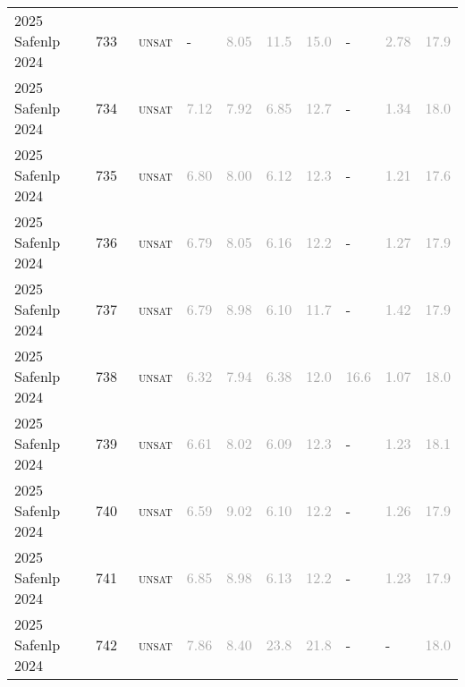 \begin{center}
{\begin{longtable}{@{}llllllllll@{}}
2025 Safenlp 2024 & 733 & ~\textsc{unsat} & - & \textcolor{darkgray}{8.05} & \textcolor{darkgray}{11.5} & \textcolor{darkgray}{15.0} & - & \textcolor{darkgray}{2.78} & \textcolor{darkgray}{17.9} \\
2025 Safenlp 2024 & 734 & ~\textsc{unsat} & \textcolor{darkgray}{7.12} & \textcolor{darkgray}{7.92} & \textcolor{darkgray}{6.85} & \textcolor{darkgray}{12.7} & - & \textcolor{darkgray}{1.34} & \textcolor{darkgray}{18.0} \\
2025 Safenlp 2024 & 735 & ~\textsc{unsat} & \textcolor{darkgray}{6.80} & \textcolor{darkgray}{8.00} & \textcolor{darkgray}{6.12} & \textcolor{darkgray}{12.3} & - & \textcolor{darkgray}{1.21} & \textcolor{darkgray}{17.6} \\
2025 Safenlp 2024 & 736 & ~\textsc{unsat} & \textcolor{darkgray}{6.79} & \textcolor{darkgray}{8.05} & \textcolor{darkgray}{6.16} & \textcolor{darkgray}{12.2} & - & \textcolor{darkgray}{1.27} & \textcolor{darkgray}{17.9} \\
2025 Safenlp 2024 & 737 & ~\textsc{unsat} & \textcolor{darkgray}{6.79} & \textcolor{darkgray}{8.98} & \textcolor{darkgray}{6.10} & \textcolor{darkgray}{11.7} & - & \textcolor{darkgray}{1.42} & \textcolor{darkgray}{17.9} \\
2025 Safenlp 2024 & 738 & ~\textsc{unsat} & \textcolor{darkgray}{6.32} & \textcolor{darkgray}{7.94} & \textcolor{darkgray}{6.38} & \textcolor{darkgray}{12.0} & \textcolor{darkgray}{16.6} & \textcolor{darkgray}{1.07} & \textcolor{darkgray}{18.0} \\
2025 Safenlp 2024 & 739 & ~\textsc{unsat} & \textcolor{darkgray}{6.61} & \textcolor{darkgray}{8.02} & \textcolor{darkgray}{6.09} & \textcolor{darkgray}{12.3} & - & \textcolor{darkgray}{1.23} & \textcolor{darkgray}{18.1} \\
2025 Safenlp 2024 & 740 & ~\textsc{unsat} & \textcolor{darkgray}{6.59} & \textcolor{darkgray}{9.02} & \textcolor{darkgray}{6.10} & \textcolor{darkgray}{12.2} & - & \textcolor{darkgray}{1.26} & \textcolor{darkgray}{17.9} \\
2025 Safenlp 2024 & 741 & ~\textsc{unsat} & \textcolor{darkgray}{6.85} & \textcolor{darkgray}{8.98} & \textcolor{darkgray}{6.13} & \textcolor{darkgray}{12.2} & - & \textcolor{darkgray}{1.23} & \textcolor{darkgray}{17.9} \\
2025 Safenlp 2024 & 742 & ~\textsc{unsat} & \textcolor{darkgray}{7.86} & \textcolor{darkgray}{8.40} & \textcolor{darkgray}{23.8} & \textcolor{darkgray}{21.8} & - & - & \textcolor{darkgray}{18.0} \\

\end{longtable}}
\end{center}
